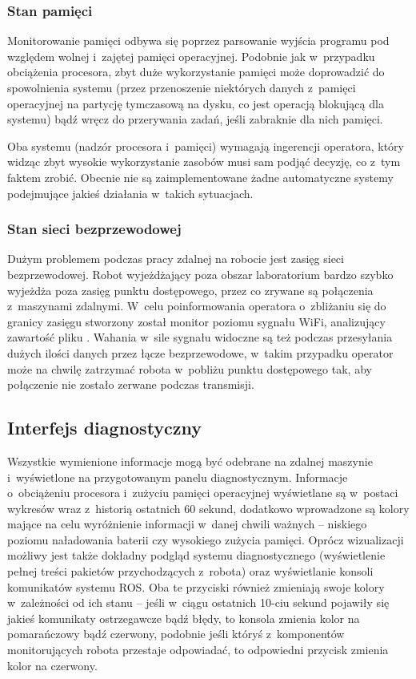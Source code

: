 \subsubsection{Stan pamięci}

Monitorowanie pamięci odbywa się poprzez parsowanie wyjścia programu 
pod względem wolnej i~zajętej pamięci operacyjnej. Podobnie jak w~przypadku
obciążenia procesora, zbyt duże wykorzystanie pamięci może doprowadzić do
spowolnienia systemu (przez przenoszenie niektórych danych z~pamięci
operacyjnej na partycję tymczasową na dysku, co jest operacją blokującą dla
systemu) bądź wręcz do przerywania zadań, jeśli zabraknie dla nich pamięci.

Oba systemu (nadzór procesora i~pamięci) wymagają ingerencji operatora, który
widząc zbyt wysokie wykorzystanie zasobów musi sam podjąć decyzję, co z~tym
faktem zrobić. Obecnie nie są zaimplementowane żadne automatyczne systemy
podejmujące jakieś działania w~takich sytuacjach.

\subsubsection{Stan sieci bezprzewodowej}

Dużym problemem podczas pracy zdalnej na robocie jest zasięg sieci
bezprzewodowej. Robot wyjeżdżający poza obszar laboratorium bardzo szybko
wyjeżdża poza zasięg punktu dostępowego, przez co zrywane są połączenia 
z~maszynami zdalnymi. W~celu poinformowania operatora o~zbliżaniu się do granicy
zasięgu stworzony został monitor poziomu sygnału WiFi, analizujący zawartość
pliku . Wahania w~sile sygnału widoczne są też podczas
przesyłania dużych ilości danych przez łącze bezprzewodowe, w~takim przypadku
operator może na chwilę zatrzymać robota w~pobliżu punktu dostępowego tak, aby
połączenie nie zostało zerwane podczas transmisji.

\subsection{Interfejs diagnostyczny}

Wszystkie wymienione informacje mogą być odebrane na zdalnej maszynie 
i~wyświetlone na przygotowanym panelu diagnostycznym. Informacje o~obciążeniu
procesora i~zużyciu pamięci operacyjnej wyświetlane są w~postaci wykresów
wraz z~historią ostatnich 60 sekund, dodatkowo wprowadzone są kolory mające
na celu wyróżnienie informacji w~danej chwili ważnych -- niskiego poziomu
naładowania baterii czy wysokiego zużycia pamięci. Oprócz wizualizacji
możliwy jest także dokładny podgląd systemu diagnostycznego (wyświetlenie
pełnej treści pakietów przychodzących z~robota) oraz wyświetlanie konsoli
komunikatów systemu ROS. Oba te przyciski również zmieniają swoje kolory
w~zależności od ich stanu -- jeśli w~ciągu ostatnich 10-ciu sekund pojawiły
się jakieś komunikaty ostrzegawcze bądź błędy, to konsola zmienia kolor na
pomarańczowy bądź czerwony, podobnie jeśli któryś z~komponentów monitorujących
robota przestaje odpowiadać, to odpowiedni przycisk zmienia kolor na czerwony.

